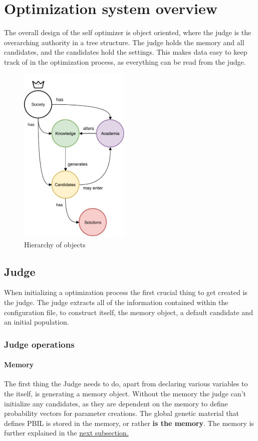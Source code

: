 \documentclass[a4paper,english]{report}
\begin{document}
		\section{Optimization system overview}
		The overall design of the self optimizer is object oriented, where the judge is the overarching authority in a tree structure. The judge holds the memory and all candidates, and the candidates hold the settings. This makes data easy to keep track of in the optimization process, as everything can be read from the judge.
		\begin{figure}[h]
			\centering
			\includegraphics[width=150pt]{OOP}
			\caption{Hierarchy of objects}
		\end{figure}
		\subsection{Judge}
		\label{sec:judge}
		When initializing a optimization process the first crucial thing to get created is the judge. The judge extracts all of the information contained within the configuration file, to construct itself, the memory object, a default candidate and an initial population.
		\subsubsection{Judge operations}
		\paragraph{Memory}
		The first thing the Judge needs to do, apart from declaring various variables to the itself, is generating a memory object. Without the memory the judge can't initialize any candidates, as they are dependent on the memory to define probability vectors for parameter creations. The global genetic material that defines PBIL is stored in the memory, or rather \textbf{is the memory}. The memory is further explained in the \hyperref[memory]{next subsection.} 
\end{document}
